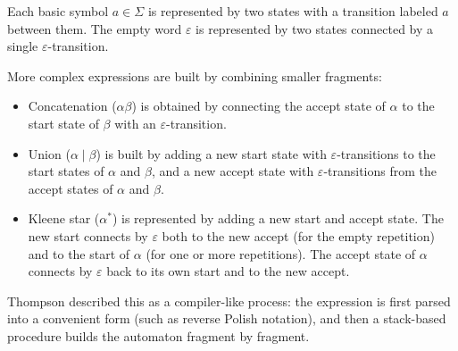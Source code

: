 Each basic symbol $a \in \Sigma$ is represented by two states with a transition labeled $a$ between them. The empty word $\varepsilon$ is represented by two states connected by a single $\varepsilon$-transition.

More complex expressions are built by combining smaller fragments:
\begin{itemize}
	\item Concatenation ($\alpha\beta$) is obtained by connecting the accept state of $\alpha$ to the start state of $\beta$ with an $\varepsilon$-transition.
	\item Union ($\alpha \mid \beta$) is built by adding a new start state with $\varepsilon$-transitions to the start states of $\alpha$ and $\beta$, and a new accept state with $\varepsilon$-transitions from the accept states of $\alpha$ and $\beta$.
	\item Kleene star ($\alpha^\ast$) is represented by adding a new start and accept state. The new start connects by $\varepsilon$ both to the new accept (for the empty repetition) and to the start of $\alpha$ (for one or more repetitions). The accept state of $\alpha$ connects by $\varepsilon$ back to its own start and to the new accept.
\end{itemize}

Thompson described this as a compiler-like process: the expression is first parsed into a convenient form (such as reverse Polish notation), and then a stack-based procedure builds the automaton fragment by fragment.


